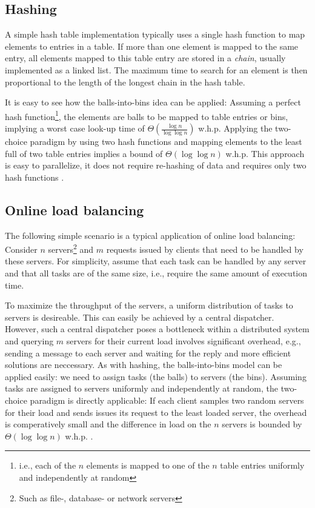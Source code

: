 \documentclass{acm_proc_article-sp}
\begin{document}
\subsection{Hashing}
\label{sec:hashing}
A simple hash table implementation typically uses a single hash function to map elements to entries in a table. If more than one element is mapped to the same entry, all elements mapped to this table entry are stored in a \emph{chain}, usually implemented as a linked list. The maximum time to search for an element is then proportional to the length of the longest chain in the hash table. 

It is easy to see how the balls-into-bins idea can be applied: Assuming a perfect hash function\footnote{i.e., each of the $n$ elements is mapped to one of the $n$ table entries uniformly and independently at random}, the elements are balls to be mapped to table entries or bins, implying a worst case look-up time of $\Theta\left(\frac{\log n}{\log \log n}\right)$ w.h.p. Applying the two-choice paradigm by using two hash functions and mapping elements to the least full of two table entries implies a bound of $\Theta\left(\log \log n\right)$ w.h.p. This approach is easy to parallelize, it does not require re-hashing of data and requires only two hash functions \cite{ABKU99} \cite{MRS01}.

\subsection{Online load balancing}
\label{sec:loadbalancing}
The following simple scenario is a typical application of online load balancing: Consider $n$ servers\footnote{Such as file-, database- or network servers} and $m$ requests issued by clients that need to be handled by these servers. For simplicity, assume that each task can be handled by any server and that all tasks are of the same size, i.e., require the same amount of execution time.

To maximize the throughput of the servers, a uniform distribution of tasks to servers is desireable. This can easily be achieved by a central dispatcher. However, such a central dispatcher poses a bottleneck within a distributed system and querying $m$ servers for their current load involves significant overhead, e.g., sending a message to each server and waiting for the reply and more efficient solutions are neccessary. As with hashing, the balls-into-bins model can be applied easily: we need to assign tasks (the balls) to servers (the bins). Assuming tasks are assigned to servers uniformly and independently at random, the two-choice paradigm is directly applicable: If each client samples two random servers for their load and sends issues its request to the least loaded server, the overhead is comperatively small and the difference in load on the $n$ servers is bounded by $\Theta\left(\log \log n\right)$ w.h.p. \cite{KLM92} \cite{RS98} \cite{MRS01}.  
\end{document}
